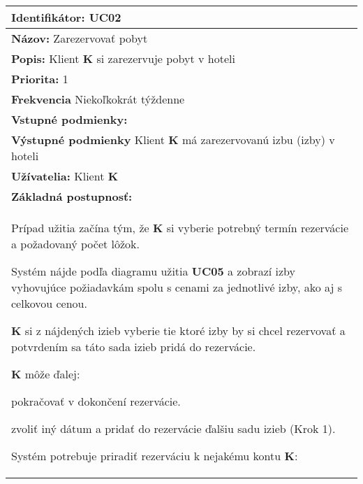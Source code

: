 \begin{center}
\begin{tabularx}{\textwidth}{| X |}
  \hline
  \textbf{Identifikátor:} UC02\\
  \hline
  \textbf{Názov:} Zarezervovať pobyt\\
  \hline
  \textbf{Popis:} Klient \textbf{K} si zarezervuje pobyt v hoteli \\
  \hline
  \textbf{Priorita:} 1 \\
  \hline
  \textbf{Frekvencia} Niekoľkokrát týždenne \\
  \hline
  \textbf{Vstupné podmienky:} \\
  \hline
  \textbf{Výstupné podmienky} Klient \textbf{K} má zarezervovanú izbu (izby) v hoteli \\
  \hline
  \textbf{Užívatelia:} Klient \textbf{K} \\ %
  \hline
  \textbf{Základná postupnosť:} \\
\begin{compactenum}
    \item Prípad užitia začína tým, že \textbf{K} si vyberie potrebný termín rezervácie a požadovaný počet lôžok.
    \item Systém nájde podľa diagramu užitia \textbf{UC05} a zobrazí izby vyhovujúce požiadavkám spolu s cenami za 
      jednotlivé izby, ako aj s celkovou cenou.
    \item \textbf{K} si z nájdených izieb vyberie tie ktoré izby by si chcel rezervovať a potvrdením sa táto sada izieb 
      pridá do rezervácie.
    \item \textbf{K} môže ďalej:
      \begin{compactenum}
      \item pokračovať v dokončení rezervácie.
      \item zvoliť iný dátum a pridať do rezervácie ďalšiu sadu izieb (Krok 1).
      \end{compactenum}
    \item Systém potrebuje priradiť rezerváciu k nejakému kontu \textbf{K}: 
      \begin{compactenum}

\end{compactenum}
\end{compactenum}
\end{tabularx}
\end{center}
